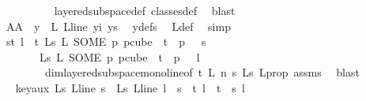 \begin{isabellebody}
\ \ \ \ \ \ \ \ \isamarkupfalse%
\ layered{\isacharunderscore}{\kern0pt}subspace{\isacharunderscore}{\kern0pt}def\ classes{\isacharunderscore}{\kern0pt}def\ \isamarkupfalse%
\ blast\isanewline
\ \ \ \ \ \ \isamarkupfalse%
\ \isamarkupfalse%
\ AA{}{\isacharcolon}{\kern0pt}\ {\isachardoublequoteopen}{\isasymchi}\ y\ {\isacharequal}{\kern0pt}\ {\isasymchi}L\ {\isacharparenleft}{\kern0pt}L{\isacharunderscore}{\kern0pt}line\ yi{\isacharparenright}{\kern0pt}\ ys{\isachardoublequoteclose}\ \isamarkupfalse%
\ ydefs\ \isamarkupfalse%
\ {\isasymchi}L{\isacharunderscore}{\kern0pt}def\ \isamarkupfalse%
\ simp\isanewline
\isanewline
\ \ \ \ \ \ \isamarkupfalse%
\ {\isachardoublequoteopen}{\isasymforall}s{\isacharless}{\kern0pt}t{\isachardot}{\kern0pt}\ {\isasymforall}l\ {\isacharless}{\kern0pt}\ t{\isachardot}{\kern0pt}\ {\isasymchi}L{\isacharunderscore}{\kern0pt}s\ {\isacharparenleft}{\kern0pt}L\ {\isacharparenleft}{\kern0pt}SOME\ p{\isachardot}{\kern0pt}\ p{\isasymin}cube\ {}\ {\isacharparenleft}{\kern0pt}t{\isacharplus}{\kern0pt}{}{\isacharparenright}{\kern0pt}\ {\isasymand}\ p\ {}\ {\isacharequal}{\kern0pt}\ s{\isacharparenright}{\kern0pt}{\isacharparenright}{\kern0pt}\isanewline
\ \ \ \ \ \ {\isacharequal}{\kern0pt}\ {\isasymchi}L{\isacharunderscore}{\kern0pt}s\ {\isacharparenleft}{\kern0pt}L\ {\isacharparenleft}{\kern0pt}SOME\ p{\isachardot}{\kern0pt}\ p{\isasymin}cube\ {}\ {\isacharparenleft}{\kern0pt}t{\isacharplus}{\kern0pt}{}{\isacharparenright}{\kern0pt}\ {\isasymand}\ p\ {}\ {\isacharequal}{\kern0pt}\ l{\isacharparenright}{\kern0pt}{\isacharparenright}{\kern0pt}{\isachardoublequoteclose}\ \isamarkupfalse%
\isanewline
\ \ \ \ \ \ \ \ dim{}{\isacharunderscore}{\kern0pt}layered{\isacharunderscore}{\kern0pt}subspace{\isacharunderscore}{\kern0pt}mono{\isacharunderscore}{\kern0pt}line{\isacharbrackleft}{\kern0pt}of\ t\ L\ n\ s\ {\isasymchi}L{\isacharunderscore}{\kern0pt}s{\isacharbrackright}{\kern0pt}\ L{\isacharunderscore}{\kern0pt}prop\ assms{\isacharparenleft}{\kern0pt}{}{\isacharparenright}{\kern0pt}\ \isamarkupfalse%
\ blast\isanewline
\ \ \ \ \ \ \isamarkupfalse%
\ \isamarkupfalse%
\ key{\isacharunderscore}{\kern0pt}aux{\isacharcolon}{\kern0pt}\ {\isachardoublequoteopen}{\isasymchi}L{\isacharunderscore}{\kern0pt}s\ {\isacharparenleft}{\kern0pt}L{\isacharunderscore}{\kern0pt}line\ s{\isacharparenright}{\kern0pt}\ {\isacharequal}{\kern0pt}\ {\isasymchi}L{\isacharunderscore}{\kern0pt}s\ {\isacharparenleft}{\kern0pt}L{\isacharunderscore}{\kern0pt}line\ l{\isacharparenright}{\kern0pt}{\isachardoublequoteclose}\ \ {\isachardoublequoteopen}s\ {\isasymin}\ {\isacharbraceleft}{\kern0pt}{\isachardot}{\kern0pt}{\isachardot}{\kern0pt}{\isacharless}{\kern0pt}t{\isacharbraceright}{\kern0pt}{\isachardoublequoteclose}\ {\isachardoublequoteopen}l\ {\isasymin}\ {\isacharbraceleft}{\kern0pt}{\isachardot}{\kern0pt}{\isachardot}{\kern0pt}{\isacharless}{\kern0pt}t{\isacharbraceright}{\kern0pt}{\isachardoublequoteclose}\ \ s\ l\ \isanewline

\end{isabellebody}
